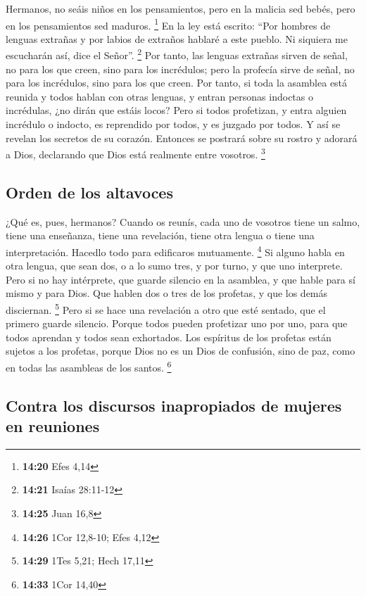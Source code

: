  Hermanos, no seáis niños en los pensamientos, pero en la
malicia sed bebés, pero en los pensamientos sed maduros. \footnote{\textbf{14:20}
  Efes 4,14}  En la ley está escrito: ``Por hombres de
lenguas extrañas y por labios de extraños hablaré a este pueblo. Ni
siquiera me escucharán así, dice el Señor''. \footnote{\textbf{14:21}
  Isaías 28:11-12}  Por tanto, las lenguas extrañas
sirven de señal, no para los que creen, sino para los incrédulos; pero
la profecía sirve de señal, no para los incrédulos, sino para los que
creen.  Por tanto, si toda la asamblea está reunida y
todos hablan con otras lenguas, y entran personas indoctas o incrédulas,
¿no dirán que estáis locos?  Pero si todos profetizan, y
entra alguien incrédulo o indocto, es reprendido por todos, y es juzgado
por todos.  Y así se revelan los secretos de su corazón.
Entonces se postrará sobre su rostro y adorará a Dios, declarando que
Dios está realmente entre vosotros. \footnote{\textbf{14:25} Juan 16,8}

\hypertarget{orden-de-los-altavoces}{%
\subsection{Orden de los altavoces}\label{orden-de-los-altavoces}}

 ¿Qué es, pues, hermanos? Cuando os reunís, cada uno de
vosotros tiene un salmo, tiene una enseñanza, tiene una revelación,
tiene otra lengua o tiene una interpretación. Hacedlo todo para
edificaros mutuamente. \footnote{\textbf{14:26} 1Cor 12,8-10; Efes 4,12}
 Si alguno habla en otra lengua, que sean dos, o a lo
sumo tres, y por turno, y que uno interprete.  Pero si no
hay intérprete, que guarde silencio en la asamblea, y que hable para sí
mismo y para Dios.  Que hablen dos o tres de los
profetas, y que los demás disciernan. \footnote{\textbf{14:29} 1Tes
  5,21; Hech 17,11}  Pero si se hace una revelación a
otro que esté sentado, que el primero guarde silencio. 
Porque todos pueden profetizar uno por uno, para que todos aprendan y
todos sean exhortados.  Los espíritus de los profetas
están sujetos a los profetas,  porque Dios no es un Dios
de confusión, sino de paz, como en todas las asambleas de los santos.
\footnote{\textbf{14:33} 1Cor 14,40}

\hypertarget{contra-los-discursos-inapropiados-de-mujeres-en-reuniones}{%
\subsection{Contra los discursos inapropiados de mujeres en
reuniones}\label{contra-los-discursos-inapropiados-de-mujeres-en-reuniones}}

